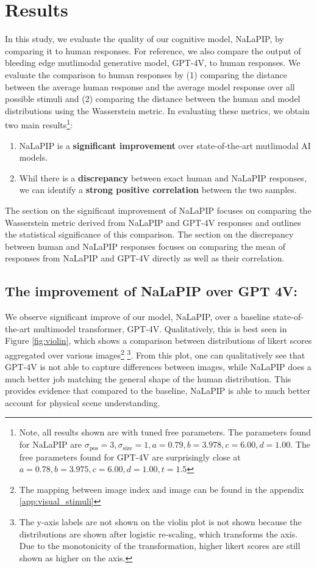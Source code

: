 \documentclass[10pt,letterpaper]{article}
\begin{document}
\section{Results}

In this study, we evaluate the quality of our cognitive model, NaLaPIP, by comparing it to human responses. For reference, we also compare the output of bleeding edge mutlimodal generative model, GPT-4V, to human responses. We evaluate the comparison to human responses by (1) comparing the distance between the average human response and the average model response over all possible stimuli and (2) comparing the distance between the human and model distributions using the Wasserstein metric. In evaluating these metrics, we obtain two main results\footnote{Note, all results shown are with tuned free parameters. The parameters found for NaLaPIP are $\sigma_{\text{pos}} = 3, \sigma_{\text{size}} = 1, a=0.79, b=3.978, c=6.00, d=1.00$. The free parameters found for GPT-4V are surprisingly close at $a=0.78, b=3.975, c=6.00, d=1.00, t=1.5$}:
\begin{enumerate}
    \item NaLaPIP is a \textbf{significant improvement} over state-of-the-art mutlimodal AI models.
    \item Whil there is a \textbf{discrepancy} between exact human and NaLaPIP responses, we can identify a \textbf{strong positive correlation} between the two samples. 
\end{enumerate}

The section on the significant improvement of NaLaPIP focuses on comparing the Wasserstein metric derived from NaLaPIP and GPT-4V responses and outlines the statistical significance of this comparison. The section on the discrepancy between human and NaLaPIP responses focuses on comparing the mean of responses from NaLaPIP and GPT-4V directly as well as their correlation.


\subsection{The improvement of NaLaPIP over GPT 4V:}

We observe significant improve of our model, NaLaPIP, over a baseline state-of-the-art multimodel transformer, GPT-4V. Qualitatively, this is best seen in Figure \ref{fig:violin}, which shows a comparison between distributions of likert scores aggregated over various images\footnote{The mapping between image index and image can be found in the appendix \autoref{app:visual_stimuli}} \footnote{The y-axis labels are not shown on the violin plot is not shown because the distributions are shown after logistic re-scaling, which transforms the axis. Due to the monotonicity of the transformation, higher likert scores are still shown as higher on the axis.}. From this plot, one can qualitatively see that GPT-4V is not able to capture differences between images, while NaLaPIP does a much better job matching the general shape of the human distribution. This provides evidence that compared to the baseline, NaLaPIP is able to much better account for physical scene understanding.
\end{document}
